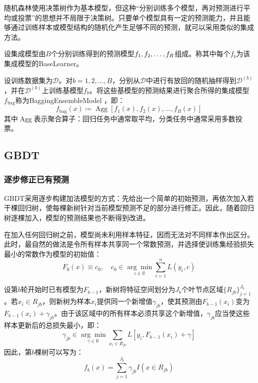\begin{note}
	随机森林使用决策树作为基本模型，但这种“分别训练多个模型，再对预测进行平均或投票”的思想并不局限于决策树。只要单个模型具有一定的预测能力，并且能够通过训练样本或模型结构的随机化产生足够不同的预测，就可以采用类似的集成方法。
\end{note}
\begin{definition}
	设集成模型由$B$个分别训练得到的预测模型$f_1, f_2, \dots, f_{B}$组成。称其中每个$f_b$为该集成模型的\gls{BaseLearner}。
\end{definition}
\begin{definition}
	设训练数据集为$\mathcal{D}$。对$b=1,2,\dots,B$，分别从$\mathcal{D}$中进行有放回的随机抽样得到$\mathcal{D}^{(b)}$，并在$\mathcal{D}^{(b)}$上训练基模型$f_b$。将这些基模型的预测结果进行聚合所得的集成模型$f_{\mathrm{bag}}$称为\gls{BaggingEnsembleModel} ，即：
	\begin{equation*}
		f_{\mathrm{bag}}(x)\coloneq\operatorname{Agg}\left[f_1(x),f_2(x),\dots,f_B(x)\right]
	\end{equation*}
	其中$\operatorname{Agg}$表示聚合算子：回归任务中通常取平均，分类任务中通常采用多数投票。
\end{definition}

\subsection{GBDT}
\subsubsection{逐步修正已有预测}
\gls{GBDT}采用逐步构建加法模型的方式：先给出一个简单的初始预测，再依次加入若干棵回归树，使每棵新树针对当前模型预测不足的部分进行修正。因此，随着回归树逐棵加入，模型的预测结果也不断得到改进。\par
在加入任何回归树之前，模型尚未利用样本特征，因而无法对不同样本作出区分。此时，最自然的做法是令所有样本共享同一个常数预测，并选择使训练集经验损失最小的常数作为模型的初始值：
\begin{equation*}
	F_0(x)\equiv c_0,\quad c_0\in\underset{c\in\mathbb{R}}{\arg\min}\sum_{i=1}^{n}L(y_i,c)
\end{equation*}\par
设第$b$轮开始时已有模型为$F_{b-1}$，新树将特征空间划分为$J_b$个叶节点区域$\{R_{jb}\}_{j=1}^{J_b}$。若$x_i\in R_{jb}$，则新树为样本$x_i$提供同一个新增值$\gamma_{jb}$，使其预测由$F_{b-1}(x_i)$变为$F_{b-1}(x_i)+\gamma_{jb}$。由于该区域中的所有样本必须共享这个新增值，$\gamma_{jb}$应当使这些样本更新后的总损失最小，即：
\begin{equation*}
	\gamma_{jb}\in
	\underset{\gamma\in\mathbb{R}^{}}{\arg\min}
	\sum_{x_i\in R_{jb}}
	L[y_i,F_{b-1}(x_i)+\gamma]
\end{equation*}
因此，第$b$棵树可以写为：
\begin{equation*}
	f_b(x)=\sum_{j=1}^{J_b}\gamma_{jb}I(x\in R_{jb})
\end{equation*}
